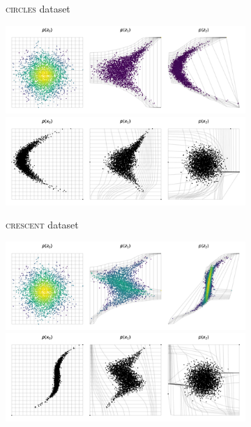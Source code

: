\begin{figure}[!htb]
\begin{center}
\begin{subfigure}{0.48\linewidth}
      \caption{\textsc{circles} dataset}
      \label{fig:NF_2D_CIRCLES}
    \end{subfigure}
    \vspace{1em}
    \begin{subfigure}{0.48\linewidth}
      \centering
      \includegraphics[width=\linewidth,trim=0cm 0cm 0cm 1.6cm, clip]{figures/2D/CRESCENT/plot_generative_flow_evolution.png}
      \includegraphics[width=\linewidth,trim=0cm 0cm 0cm 1.6cm, clip]{figures/2D/CRESCENT/plot_normalizing_flow_evolution.png}
      \caption{\textsc{crescent} dataset}
      \label{fig:NF_2D_CRESCENT}
    \end{subfigure}
    \hfill{\color{lightgray}\vrule}\hfill
    \begin{subfigure}{0.48\linewidth}
      \centering
      \includegraphics[width=\linewidth,trim=0cm 0cm 0cm 1.6cm, clip]{figures/2D/CRESCENTCUBED/plot_generative_flow_evolution.png}
      \includegraphics[width=\linewidth,trim=0cm 0cm 0cm 1.6cm, clip]{figures/2D/CRESCENTCUBED/plot_normalizing_flow_evolution.png}

\end{subfigure}
\end{center}
\end{figure}

